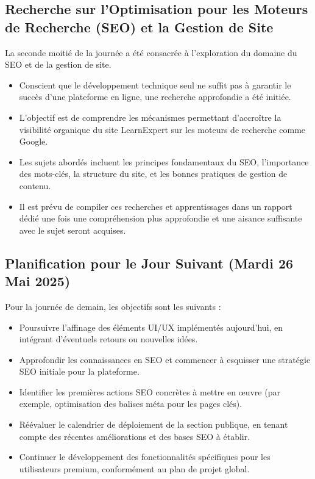 \documentclass[12pt, a4paper]{article}
\begin{document}
\subsection{Recherche sur l'Optimisation pour les Moteurs de Recherche (SEO) et la Gestion de Site}
La seconde moitié de la journée a été consacrée à l'exploration du domaine du SEO et de la gestion de site.
\begin{itemize}
    \item Conscient que le développement technique seul ne suffit pas à garantir le succès d'une plateforme en ligne, une recherche approfondie a été initiée.
    \item L'objectif est de comprendre les mécanismes permettant d'accroître la visibilité organique du site LearnExpert sur les moteurs de recherche comme Google.
    \item Les sujets abordés incluent les principes fondamentaux du SEO, l'importance des mots-clés, la structure du site, et les bonnes pratiques de gestion de contenu.
    \item Il est prévu de compiler ces recherches et apprentissages dans un rapport dédié une fois une compréhension plus approfondie et une aisance suffisante avec le sujet seront acquises.
\end{itemize}

\subsection{Planification pour le Jour Suivant (Mardi 26 Mai 2025)}
Pour la journée de demain, les objectifs sont les suivants :
\begin{itemize}
  \item Poursuivre l'affinage des éléments UI/UX implémentés aujourd'hui, en intégrant d'éventuels retours ou nouvelles idées.
  \item Approfondir les connaissances en SEO et commencer à esquisser une stratégie SEO initiale pour la plateforme.
  \item Identifier les premières actions SEO concrètes à mettre en œuvre (par exemple, optimisation des balises méta pour les pages clés).
  \item Réévaluer le calendrier de déploiement de la section publique, en tenant compte des récentes améliorations et des bases SEO à établir.
  \item Continuer le développement des fonctionnalités spécifiques pour les utilisateurs premium, conformément au plan de projet global.
\end{itemize}
\end{document}
